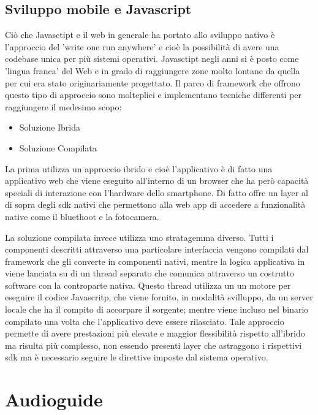 \subsection{Sviluppo mobile e Javascript}\vspace{5mm}

Ciò che Javasctipt e il web in generale ha portato allo sviluppo nativo è l'approccio del 'write one run anywhere' e cioè la possibilità di avere una codebase unica per più sistemi operativi. Javasctipt negli anni si è posto come 'lingua franca' del Web e in grado di raggiungere zone molto lontane da quella per cui era stato originariamente progettato. Il parco di framework che offrono questo tipo di approccio sono molteplici e implementano tecniche differenti per raggiungere il medesimo scopo:
\begin{itemize}
\item Soluzione Ibrida
\item Soluzione Compilata
\end{itemize}

La prima utilizza un approccio ibrido e cioè l'applicativo è di fatto una applicativo web che viene eseguito all'interno di un browser che ha però capacità speciali di interazione con l'hardware dello smartphone. Di fatto offre un layer al di sopra degli sdk nativi che permettono alla web app di accedere a funzionalità native come il bluethoot e la fotocamera.\vspace{5mm}

La soluzione compilata invece utilizza uno stratagemma diverso. Tutti i componenti descritti attraverso una particolare interfaccia vengono compilati dal framework che gli converte in componenti nativi, mentre la logica applicativa in viene lanciata su di un thread separato che comunica attraverso un costrutto software con la controparte nativa. Questo thread utilizza un un motore per eseguire il codice Javascritp, che viene fornito, in modalità svilluppo, da un server locale che ha il compito di accorpare il sorgente; mentre viene incluso nel binario compilato una volta che l'applicativo deve essere rilasciato. Tale approccio permette di avere prestazioni più elevate e maggior flessibilità rispetto all'ibrido ma risulta più complesso, non essendo presenti layer che astraggono i rispettivi sdk ma è necessario seguire le direttive imposte dal sistema operativo.


\section{Audioguide}\vspace{5mm}

